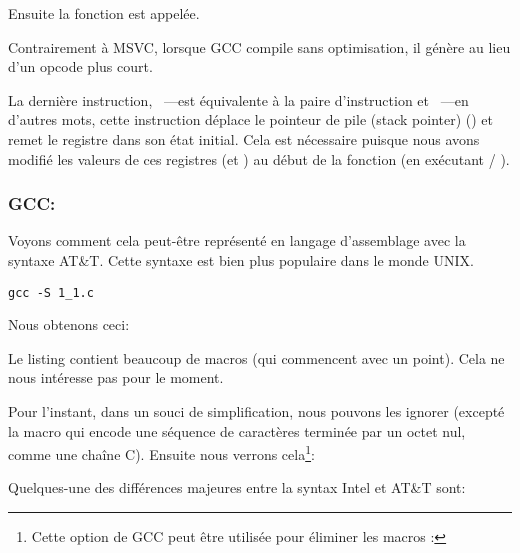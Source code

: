 Ensuite la fonction \printf est appelée.

Contrairement à MSVC, lorsque GCC compile sans optimisation, il génère  au lieu d'un opcode plus court.

La dernière instruction, \LEAVE~---est équivalente à la paire d'instruction  et ~---en d'autres mots,
cette instruction déplace le pointeur de pile (\gls{stack pointer}) (\ESP) et remet le registre \EBP dans son état initial.
Cela est nécessaire puisque nous avons modifié les valeurs de ces registres (\ESP et \EBP) au début de la fonction (en exécutant  / ).

\subsubsection{GCC: \ATTSyntax}
\label{ATT_syntax}

Voyons comment cela peut-être représenté en langage d'assemblage avec la syntaxe AT\&T.
Cette syntaxe est bien plus populaire dans le monde UNIX.

\begin{lstlisting}[caption=compilons avec GCC 4.7.3]
gcc -S 1_1.c
\end{lstlisting}

Nous obtenons ceci:



Le listing contient beaucoup de macros (qui commencent avec un point). Cela ne nous intéresse pas pour le moment.

Pour l'instant, dans un souci de simplification, nous pouvons les ignorer (excepté la macro 
qui encode une séquence de caractères terminée par un octet nul, comme une chaîne C).
Ensuite nous verrons cela\footnote{Cette option de GCC peut être utilisée pour éliminer les macros :
}:



\myindex{\ATTSyntax}
\myindex{\IntelSyntax}
Quelques-une des différences majeures entre la syntax Intel et AT\&T sont:


